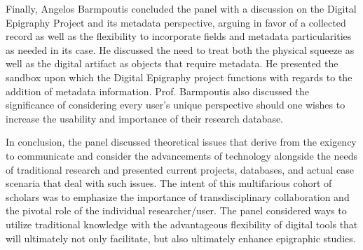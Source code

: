 \documentclass[amsthm,ebook]{saparticle}
\begin{document}
Finally, Angelos Barmpoutis concluded the panel with a discussion on the Digital Epigraphy Project and its metadata perspective, arguing in favor of a collected record as well as the flexibility to incorporate fields and metadata particularities as needed in its case. He discussed the need to treat both the physical squeeze as well as the digital artifact as objects that require metadata. He presented the sandbox upon which the Digital Epigraphy project functions with regards to the addition of metadata information. Prof. Barmpoutis also discussed the significance of considering every user’s unique perspective should one wishes to increase the usability and importance of their research database. 

In conclusion, the panel discussed theoretical issues that derive from the exigency to communicate and consider the advancements of technology alongside the needs of traditional research and presented current projects, databases, and actual case scenaria that deal with such issues. The intent of this multifarious cohort of scholars was to emphasize the importance of transdisciplinary collaboration and the pivotal role of the individual researcher/user. The panel considered ways to utilize traditional knowledge with the advantageous flexibility of digital tools that will ultimately not only facilitate, but also ultimately enhance epigraphic studies.
\end{document}

